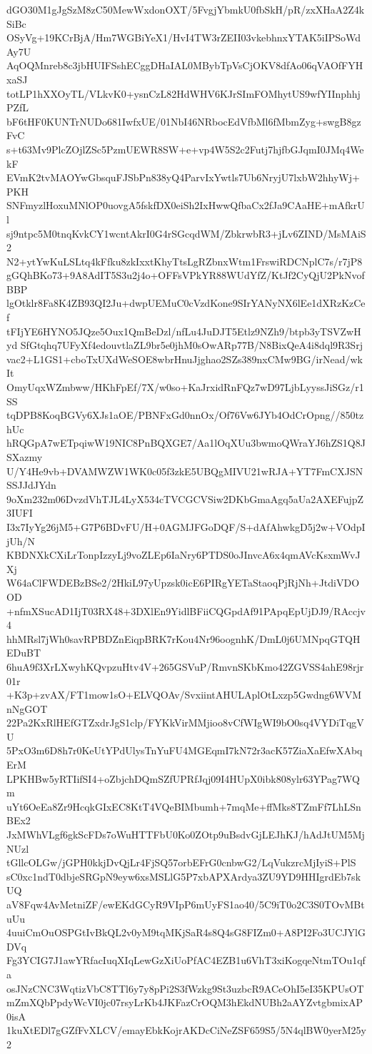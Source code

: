 dGO30M1gJgSzM8zC50MewWxdonOXT/5FvgjYbmkU0fbSkH/pR/zxXHaA2Z4kSiBc
OSyVg+19KCrBjA/Hm7WGBiYeX1/HvI4TW3rZEII03vkebhnxYTAK5iIPSoWdAy7U
AqOQMnreb8c3jbHUIFSshECggDHaIAL0MBybTpVsCjOKV8dfAo06qVAOfFYHxaSJ
totLP1hXXOyTL/VLkvK0+ysnCzL82HdWHV6KJrSImFOMhytUS9wfYIInphhjPZfL
bF6tHF0KUNTrNUDo681IwfxUE/01NbI46NRbocEdVfbMl6fMbmZyg+swgB8gzFvC
s+t63Mv9PlcZOjlZSc5PzmUEWR8SW+e+vp4W5S2c2Futj7hjfbGJqmI0JMq4WekF
EVmK2tvMAOYwGbsquFJSbPn838yQ4ParvIxYwtls7Ub6NryjU7lxbW2hhyWj+PKH
SNFmyzlHoxuMNlOP0uovgA5fskfDX0eiSh2IxHwwQfbaCx2fJa9CAaHE+mAfkrUl
sj9ntpc5M0tnqKvkCY1wcntAkrI0G4rSGcqdWM/ZbkrwbR3+jLv6ZIND/MsMAiS2
N2+ytYwKuLSLtq4kFfku8zkIxxtKhyTtsLgRZbnxWtm1FrswiRDCNplC7s/r7jP8
gGQhBKo73+9A8AdIT5S3u2j4o+OFFsVPkYR88WUdYfZ/KtJf2CyQjU2PkNvofBBP
lgOtklr8Fa8K4ZB93QI2Ju+dwpUEMuC0cVzdKone9SIrYANyNX6lEe1dXRzKzCef
tFIjYE6HYNO5JQze5Oux1QmBeDzl/nfLu4JuDJT5Etlz9NZh9/btpb3yTSVZwHyd
SfGtqhq7UFyXf4edouvtlaZL9br5e0jhM0sOwARp77B/N8BixQeA4i8dql9R3Srj
vac2+L1GS1+cboTxUXdWeSOE8wbrHnuJjghao2SZs389nxCMw9BG/irNead/wkIt
OmyUqxWZmbww/HKhFpEf/7X/w0so+KaJrxidRnFQz7wD97LjbLyyssJiSGz/r1SS
tqDPB8KoqBGVy6XJs1aOE/PBNFxGd0nnOx/Of76Vw6JYb4OdCrOpng//850tzhUc
hRQGpA7wETpqiwW19NIC8PnBQXGE7/Aa1lOqXUu3bwmoQWraYJ6hZS1Q8JSXazmy
U/Y4He9vb+DVAMWZW1WK0c05f3zkE5UBQgMIVU21wRJA+YT7FmCXJSNSSJJdJYdn
9oXm232m06DvzdVhTJL4LyX534cTVCGCVSiw2DKbGmaAgq5aUa2AXEFujpZ3IUFI
I3x7IyYg26jM5+G7P6BDvFU/H+0AGMJFGoDQF/S+dAfAhwkgD5j2w+VOdpIjUh/N
KBDNXkCXiLrTonpIzzyLj9voZLEp6IaNry6PTDS0oJInvcA6x4qmAVcKsxmWvJXj
W64aClFWDEBzBSe2/2HkiL97yUpzsk0icE6PIRgYETaStaoqPjRjNh+JtdiVDOOD
+nfmXSucAD1IjT03RX48+3DXlEn9YidlBFiiCQGpdAf91PApqEpUjDJ9/RAccjv4
hhMRsl7jWh0savRPBDZnEiqpBRK7rKou4Nr96oognhK/DmL0j6UMNpqGTQHEDuBT
6huA9f3XrLXwyhKQvpzuHtv4V+265GSVuP/RmvnSKbKmo42ZGVSS4ahE98rjr01r
+K3p+zvAX/FT1mow1sO+ELVQOAv/SvxiintAHULAplOtLxzp5Gwdng6WVMnNgGOT
22Pa2KxRlHEfGTZxdrJgS1clp/FYKkVirMMjioo8vCfWIgWI9bO0sq4VYDiTqgVU
5PxO3m6D8h7r0KeUtYPdUlysTnYuFU4MGEqmI7kN72r3acK57ZiaXaEfwXAbqErM
LPKHBw5yRTIifSI4+oZbjchDQmSZfUPRfJqj09I4HUpX0ibk808ylr63YPag7WQm
uYt6OeEa8Zr9HcqkGIxEC8KtT4VQeBIMbumh+7mqMe+ffMks8TZmFf7LhLSnBEx2
JxMWhVLgf6gkScFDs7oWuHTTFbU0Ko0ZOtp9uBsdvGjLEJhKJ/hAdJtUM5MjNUzl
tGllcOLGw/jGPH0kkjDvQjLr4FjSQ57orbEFrG0cnbwG2/LqVukzrcMjIyiS+PlS
sC0xc1ndT0dbjeSRGpN9eyw6xsMSLlG5P7xbAPXArdya3ZU9YD9HHIgrdEb7skUQ
aV8Fqw4AvMetniZF/ewEKdGCyR9VIpP6mUyFS1ao40/5C9iT0o2C3S0TOvMBtuUu
4uuiCmOuOSPGtIvBkQL2v0yM9tqMKjSaR4s8Q4sG8FIZm0+A8PI2Fo3UCJYlGDVq
Fg3YCIG7J1awYRfacIuqXIqLewGzXiUoPfAC4EZB1u6VhT3xiKogqeNtmTOu1qfa
osJNzCNC3WqtizVbC8TTl6y7y8pPi2S3fWzkg9St3uzbcR9ACeOhI5eI35KPUsOT
mZmXQbPpdyWcVI0jc07rsyLrKb4JKFazCrOQM3hEkdNUBh2aAYZvtgbmixAP0isA
1kuXtEDl7gGZfFvXLCV/emayEbkKojrAKDcCiNeZSF659S5/5N4qlBW0yerM25y2
